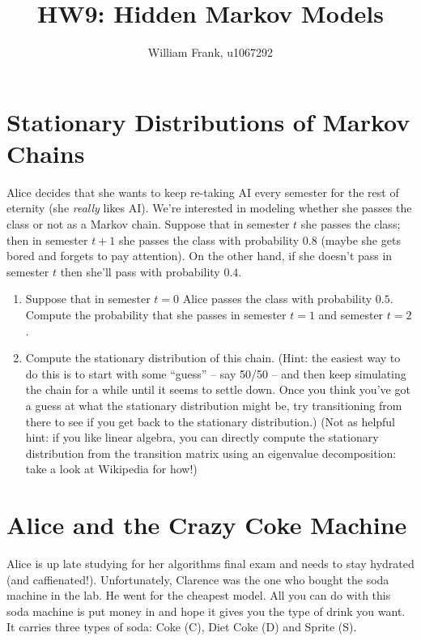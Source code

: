 \documentclass[fleqn]{hermans-hw}
\title{HW9: Hidden Markov Models}
\institute{University of Utah}
\author{William Frank, u1067292}
\begin{document}
\maketitle
\section{Stationary Distributions of Markov Chains}

Alice decides that she wants to keep re-taking AI every semester for
the rest of eternity (she \emph{really} likes AI).  We're interested
in modeling whether she passes the class or not as a Markov chain.
Suppose that in semester $t$ she passes the class; then in semester
$t+1$ she passes the class with probability $0.8$ (maybe she gets
bored and forgets to pay attention).  On the other hand, if she
doesn't pass in semester $t$ then she'll pass with probability $0.4$.

\begin{enumerate}
\item Suppose that in semester $t=0$ Alice passes the class with
  probability $0.5$.  Compute the probability that she passes in
  semester $t=1$ and semester $t=2$.
  
  

\item Compute the stationary distribution of this chain.  (Hint: the
  easiest way to do this is to start with some ``guess'' -- say 50/50
  -- and then keep simulating the chain for a while until it seems to
  settle down.  Once you think you've got a guess at what the
  stationary distribution might be, try transitioning from there to
  see if you get back to the stationary distribution.)  (Not as
  helpful hint: if you like linear algebra, you can directly compute
  the stationary distribution from the transition matrix using an
  eigenvalue decomposition: take a look at Wikipedia for how!)
\end{enumerate}
\vspace{-0.5cm}
\section{Alice and the Crazy Coke Machine}
\vspace{-0.5cm}
Alice is up late studying for her algorithms final exam and needs to
stay hydrated (and caffienated!).  Unfortunately, Clarence was the one
who bought the soda machine in the lab.  He went for the cheapest
model.  All you can do with this soda machine is put money in and hope
it gives you the type of drink you want.  It carries three types of
soda: Coke (C), Diet Coke (D) and Sprite (S).
\end{document}

